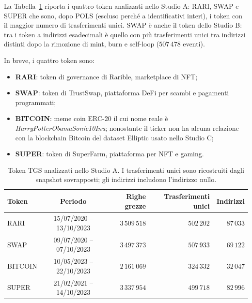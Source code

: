 \documentclass[11pt]{article}
\begin{document}
La Tabella~\ref{tab:tgs_tokens} riporta i quattro token analizzati nello
Studio A: RARI, SWAP e SUPER che sono, dopo POLS (escluso perché a
identificativi interi), i token con il maggior numero di trasferimenti unici.
SWAP è anche il token dello Studio B: tra i token a indirizzi esadecimali è
quello con più trasferimenti unici tra indirizzi distinti dopo la rimozione
di mint, burn e self-loop ($507\,478$ eventi).

In breve, i quattro token sono:
\begin{itemize}
    \item \textbf{RARI}: token di governance di Rarible, marketplace di NFT;
    \item \textbf{SWAP}: token di TrustSwap, piattaforma DeFi per scambi e
          pagamenti programmati;
    \item \textbf{BITCOIN}: meme coin ERC-20 il cui nome reale è
          \emph{HarryPotterObamaSonic10Inu}; nonostante il ticker non ha alcuna
          relazione con la blockchain Bitcoin del dataset Elliptic usato nello
          Studio C;
    \item \textbf{SUPER}: token di SuperFarm, piattaforma per NFT e gaming.
\end{itemize}

\begin{table}[H]
\centering
\caption{Token TGS analizzati nello Studio A. I trasferimenti unici sono
ricostruiti dagli snapshot sovrapposti; gli indirizzi includono l'indirizzo
nullo.}
\label{tab:tgs_tokens}
\begin{tabular}{lcrrr}
\toprule
Token & Periodo & Righe grezze & Trasferimenti unici & Indirizzi \\
\midrule
RARI    & 15/07/2020 -- 13/10/2023 & $3\,509\,518$ & $502\,202$ & $87\,033$ \\
SWAP    & 09/07/2020 -- 07/10/2023 & $3\,497\,373$ & $507\,933$ & $69\,122$ \\
BITCOIN & 10/05/2023 -- 22/10/2023 & $2\,161\,069$ & $324\,332$ & $32\,047$ \\
SUPER   & 21/02/2021 -- 14/10/2023 & $3\,337\,954$ & $499\,718$ & $82\,996$ \\
\bottomrule
\end{tabular}
\end{table}
\end{document}
